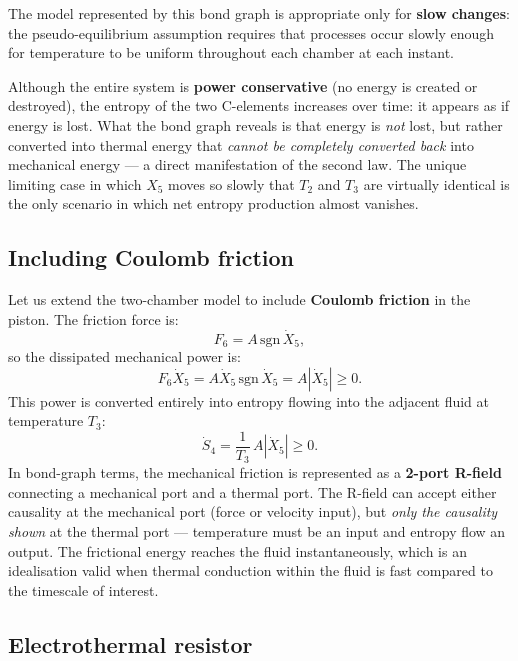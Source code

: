 The model represented by this bond graph is appropriate only for
\textbf{slow changes}: the pseudo-equilibrium assumption requires that
processes occur slowly enough for temperature to be uniform throughout each
chamber at each instant.

Although the entire system is \textbf{power conservative} (no energy is
created or destroyed), the entropy of the two C-elements increases over
time: it appears as if energy is lost.  What the bond graph reveals is that
energy is \emph{not} lost, but rather converted into thermal energy that
\emph{cannot be completely converted back} into mechanical energy --- a
direct manifestation of the second law.  The unique limiting case in which
$X_{5}$ moves so slowly that $T_{2}$ and $T_{3}$ are virtually identical is
the only scenario in which net entropy production almost vanishes.


\subsection{Including Coulomb friction}
\label{ssec:coulomb_friction}

Let us extend the two-chamber model to include \textbf{Coulomb friction}
in the piston.  The friction force is:
\begin{equation}
  F_{6} = A\,\mathrm{sgn}\,\dot{X}_{5},
  \label{eq:coulomb}
\end{equation}
so the dissipated mechanical power is:
\begin{equation}
  F_{6}\dot{X}_{5} = A\dot{X}_{5}\,\mathrm{sgn}\,\dot{X}_{5}
  = A|\dot{X}_{5}| \geq 0.
  \label{eq:friction_power}
\end{equation}
This power is converted entirely into entropy flowing into the adjacent
fluid at temperature $T_{3}$:
\begin{equation}
  \dot{S}_{4} = \frac{1}{T_{3}}\,A|\dot{X}_{5}| \geq 0.
  \label{eq:friction_entropy}
\end{equation}
In bond-graph terms, the mechanical friction is represented as a
\textbf{2-port R-field} connecting a mechanical port and a thermal port.
The R-field can accept either causality at the mechanical port (force or
velocity input), but \emph{only the causality shown} at the thermal port
--- temperature must be an input and entropy flow an output.  The
frictional energy reaches the fluid instantaneously, which is an
idealisation valid when thermal conduction within the fluid is fast
compared to the timescale of interest.


\subsection{Electrothermal resistor}
\label{ssec:electrothermal}

